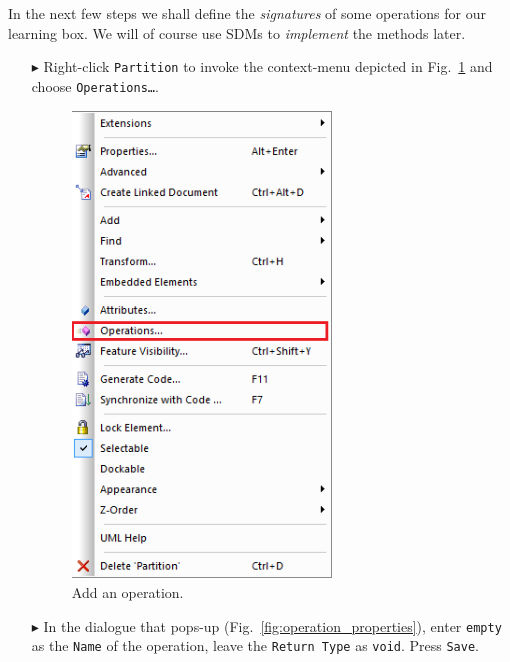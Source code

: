 In the next few steps we shall define the \emph{signatures} of some operations for our learning box.
We will of course use SDMs to \emph{implement} the methods later.

\begin{enumerate}
\item[$\blacktriangleright$] Right-click \texttt{Partition} to invoke the context-menu depicted in Fig.~\ref{fig:add_operation} and choose \texttt{Operations\ldots}.

\begin{figure}[htbp]
	\centering
  \includegraphics[width=0.65\textwidth]{pics/memBoxBilder/memBox35.png}
	\caption{Add an operation.}
	\label{fig:add_operation}
\end{figure}
\FloatBarrier

\item[$\blacktriangleright$] In the dialogue that pops-up (Fig.~\ref{fig:operation_properties}), enter \texttt{empty} as the \texttt{Name} of the operation, leave the \texttt{Return Type} as \texttt{void}.  Press \texttt{Save}.


\end{enumerate}

